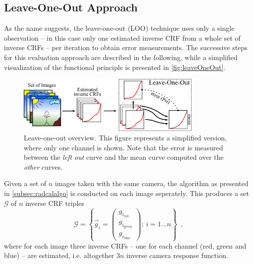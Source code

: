 \subsection{Leave-One-Out Approach}
\label{subsec:stabilityLOO}

As the name suggests, the leave-one-out (LOO) technique uses only a single observation -- in this case only one estimated inverse CRF from a whole set of inverse CRFs -- per iteration to obtain error measurements. The successive steps for this evaluation approach are described in the following, while a simplified visualization of the functional principle is presented in \autoref{fig:leaveOneOut}.

\begin{figure}[tb]
	\centering
	\includegraphics[width=0.8\textwidth]{images/loo_description.pdf}
	\caption[Leave-one-out overview]{Leave-one-out overview. This figure represents a simplified version, where only one channel is shown. Note that the error is measured between the \emph{left out} curve and the mean curve computed over the \emph{other} curves.}
	\label{fig:leaveOneOut}	
\end{figure}

Given a set of $n$ images taken with the same camera, the algorithm as presented in \autoref{subsec:radcalalgo} is conducted on each image seperately. This produces a set $\mathcal{G}$ of $n$ inverse CRF triples 
\begin{equation}
	\mathcal{G} = \left\{\vec{g}_i = 
	\begin{pmatrix} g_{i_\text{red}} \\ g_{i_\text{green}} \\ g_{i_\text{blue}} \end{pmatrix}; \ i=1 \ldots n\right\} \enspace ,
	\label{eq:setOfInverseCRFs}
\end{equation}
where for each image three inverse CRFs -- one for each channel (red, green and blue) -- are estimated, \hbox{i.e.} altogether $3n$ inverse camera response function.

